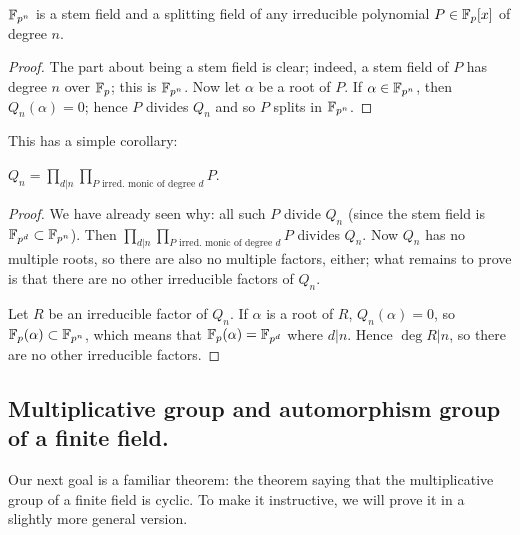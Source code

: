 \begin{thm}
$\mathbb{F}_{p^n}$ is a stem field and a splitting field of any irreducible polynomial $P \in \mathbb{F}_p[x]$ of degree $n$.
\end{thm}
\begin{proof}
The part about being a stem field is clear; indeed, a stem field of $P$ has degree $n$ over $\mathbb{F}_p$; this is $\mathbb{F}_{p^n}$. 
Now let $\alpha$ be a root of $P$. 
If $\alpha \in \mathbb{F}_{p^n}$, then $Q_n(\alpha) = 0$; hence $P$ divides $Q_n$ and so $P$ splits in $\mathbb{F}_{p^n}$.
\end{proof}

This has a simple corollary:
\begin{cor}
$Q_n = \prod_{d|n}\prod_{\text{$P$ irred. monic of degree $d$}} P$.
\end{cor}
\begin{proof}
We have already seen why: all such $P$ divide $Q_n$ (since the stem field is $\mathbb{F}_{p^d} \subset \mathbb{F}_{p^n}$). 
Then $\prod_{d|n}\prod_{\text{$P$ irred. monic of degree $d$}} P$ divides $Q_n$. 
Now $Q_n$ has no multiple roots, so there are also no multiple factors, either; what remains to prove is that there are no other irreducible factors of $Q_n$.

Let $R$ be an irreducible factor of $Q_n$. 
If $\alpha$ is a root of $R$, $Q_n(\alpha) = 0$, so $\mathbb{F}_{p}(\alpha) \subset \mathbb{F}_{p^n}$, which means that $\mathbb{F}_{p}(\alpha) = \mathbb{F}_{p^d}$ where $d|n$. 
Hence $\deg{R} | n$, so there are no other irreducible factors.
\end{proof}

\subsection{Multiplicative group and automorphism group of a finite field.}
Our next goal is a familiar theorem: the theorem saying that the multiplicative group of a finite field is cyclic. 
To make it instructive, we will prove it in a slightly more general version.

